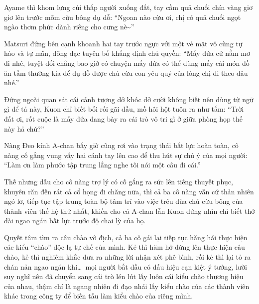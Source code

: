 \documentclass[../main.tex]{subfiles}
\begin{document}
Ayame thì khom lưng cúi thấp người xuống đất, tay cầm quả chuối chín vàng giơ giơ lên trước mõm cừu bông dụ dỗ: ``Ngoan nào cừu ơi, chị có quả chuối ngọt ngào thơm phức dành riêng cho cưng nè\~{}''

Matsuri đứng bên cạnh khoanh hai tay trước ngực với một vẻ mặt vô cùng tự hào và tự mãn, dõng dạc tuyên bố khẳng định chủ quyền: ``Mấy đứa cứ nằm mơ đi nhé, tuyệt đối chẳng bao giờ có chuyện mấy đứa có thể dùng mấy cái món đồ ăn tầm thường kia để dụ dỗ được chú cừu con yêu quý của lòng chị đi theo đâu nhé.''

Đứng ngoài quan sát cái cảnh tượng dở khóc dở cười không biết nên dùng từ ngữ gì để tả này, Kuon chỉ biết bối rối gãi đầu, mồ hôi hột tuôn ra như tắm: ``Trời đất ơi, rốt cuộc là mấy đứa đang bày ra cái trò vô tri gì ở giữa phòng họp thế này hả chứ?''

Nàng Đeo kính A-chan bấy giờ cũng rơi vào trạng thái bất lực hoàn toàn, cô nàng cố gắng vung vẩy hai cánh tay lên cao để thu hút sự chú ý của mọi người: ``Làm ơn làm phước tập trung lắng nghe tôi nói một câu đi cái.''

Thế nhưng dẫu cho cô nàng trợ lý có cố gắng ra sức lên tiếng thuyết phục, khuyên răn đến rát cả cổ họng đi chăng nữa, thì cả ba cô nàng vẫn cứ thản nhiên ngó lơ, tiếp tục tập trung toàn bộ tâm trí vào việc trêu đùa chú cừu bông của thành viên thế hệ thứ nhất, khiến cho cả A-chan lẫn Kuon đứng nhìn chỉ biết thở dài ngao ngán bất lực trước độ chai lỳ của họ.

\ct

Quyết tâm tìm ra câu chào vô địch, cả ba cô gái lại tiếp tục hăng hái thực hiện các kiểu ``chào'' độc lạ tự chế của mình. Kẻ thì hăm hở đứng lên thực hiện câu chào, kẻ thì nghiêm khắc đưa ra những lời nhận xét phê bình, rồi kẻ thì lại tỏ ra chán nản ngao ngán khi\dots\ mọi người bắt đầu có dấu hiệu cạn kiệt ý tưởng, lười suy nghĩ nên đã chuyển sang cái trò lén lút lấy luôn cái kiểu chào thương hiệu của nhau, thậm chí là ngang nhiên đi đạo nhái lấy kiểu chào của các thành viên khác trong công ty để biến tấu làm kiểu chào của riêng mình.
\end{document}
